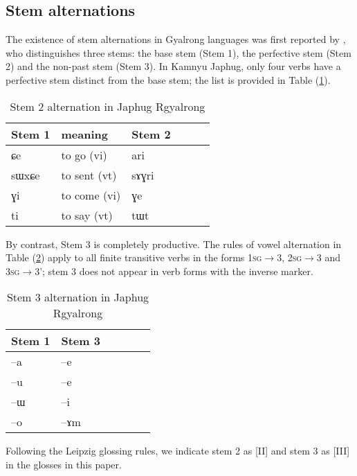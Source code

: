 \documentclass[oldfontcommands,oneside,a4paper,11pt]{article}
\newcommand{\ipa}[1]{{\phon \mbox{#1}}} %
\newcommand{\refb}[1]{(\ref{#1})}
\begin{document}
\subsection{Stem alternations} \label{sec:stem}
The existence of stem alternations in Gyalrong languages was first reported by \citet{jackson00puxi}, who distinguishes three stems: the base stem (Stem 1), the perfective stem (Stem 2) and the non-past stem (Stem 3). In Kamnyu Japhug, only four verbs have a perfective stem distinct from the base stem; the list is provided in Table \refb{tab:stem2}. 


 \begin{table}[H]
\caption{Stem 2 alternation in Japhug Rgyalrong} \label{tab:stem2} \centering
\begin{tabular}{llllll}
\toprule
Stem 1 & meaning &Stem 2 \\
\midrule
\ipa{ɕe}& to go (vi)&  \ipa{ari} \\
\ipa{sɯxɕe}& to sent (vt)  &\ipa{sɤɣri} \\
\ipa{ɣi}& to come (vi)  &\ipa{ɣe} \\
\ipa{ti}& to say (vt)  &\ipa{tɯt} \\
\bottomrule
\end{tabular}
\end{table}

By contrast, Stem 3 is completely productive. The rules of vowel alternation in Table \refb{tab:stem3} apply to all finite transitive verbs in the forms \textsc{1sg}$\rightarrow$3, \textsc{2sg}$\rightarrow$3 and \textsc{3sg}$\rightarrow$3'; stem 3 does not appear in verb forms with the inverse marker.

 \begin{table}[H]
\caption{Stem 3 alternation in Japhug Rgyalrong} \label{tab:stem3} \centering
\begin{tabular}{llllll}
\toprule
Stem 1 & Stem 3 \\
\midrule
\ipa{--a} & \ipa{--e} \\
\ipa{--u} & \ipa{--e} \\
\ipa{--ɯ} & \ipa{--i} \\
\ipa{--o} & \ipa{--ɤm} \\
\bottomrule
\end{tabular}
\end{table}

Following the Leipzig glossing rules, we indicate stem 2 as [II] and stem 3 as [III] in the glosses in this paper.
\end{document}
